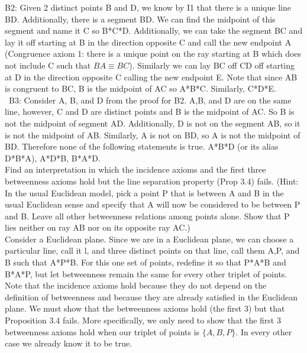 \documentclass[12pt,letterpaper]{article}
\newcommand{\prob}[1]{\newpage\noindent {\bf #1}}
\begin{document}
B2:  Given 2 distinct points B and D, we know by I1 that there is a unique line BD.  Additionally, there is a segment BD.  We can find the midpoint of this segment and name it C so B*C*D.  Additionally, we can take the segment BC and lay it off starting at B in the direction opposite C and call the new endpoint A (Congruence axiom 1: there is a unique point on the ray starting at B which does not include C such that $BA \equiv BC$).  Similarly we can lay BC off CD off starting at D in the direction opposite C calling the new endpoint E.  Note that since AB is congruent to BC, B is the midpoint of AC so A*B*C.  Similarly, C*D*E.\\

~B3: Consider A, B, and D from the proof for B2.  A,B, and D are on the same line, however, C and D are distinct points and B is the midpoint of AC. So B is not the midpoint of segment AD.  Additionally, D is not on the segment AB, so it is not the midpoint of AB.  Similarly, A is not on BD, so A is not the midpoint of BD.  Therefore none of the following statements is true.  A*B*D (or its alias D*B*A), A*D*B, B*A*D.\\








\prob{16} Find an interpretation in which the incidence axioms and the first three betweenness axioms hold but the line separation property (Prop 3.4) fails.  (Hint:  In the usual Euclidean model, pick a point P that is between A and B in the usual Euclidean sense and specify that A will now be considered to be between P and B.  Leave all other betweenness relations among points alone.  Show that P lies neither on ray AB nor on its opposite ray AC.)\\

Consider a Euclidean plane.  Since we are in a Euclidean plane, we can choose a particular line, call it l, and three distinct points on that line, call them A,P, and B such that A*P*B.  For this one set of points, redefine it so that P*A*B and B*A*P, but let betweenness remain the same for every other triplet of points.\\ 

Note that the incidence axioms hold because they do not depend on the definition of betweenness and because they are already satisfied in the Euclidean plane.  We must show that the betweenness axioms hold (the first 3) but that Proposition 3.4 fails.  More specifically, we only need to show that the first 3 betweenness axioms hold when our triplet of points is $\{A,B,P\}$.  In every other case we already know it to be true.\\
\end{document}
